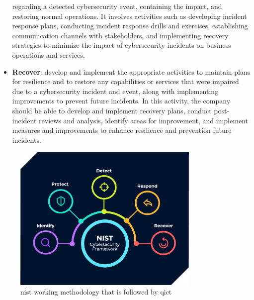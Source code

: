 \begin{itemize}
            regarding a detected cybersecurity event, containing the impact, and restoring normal operations.
            It involves activities such as developing incident response plans, conducting incident response
            drills and exercises, establishing communication channels with stakeholders, and implementing
            recovery strategies to minimize the impact of cybersecurity incidents on business operations and
            services.
      \item \textbf{Recover}: develop and implement the appropriate activities to maintain plans for
            resilience and to restore any capabilities or services that were impaired due to a cybersecurity
            incident and event, along with implementing improvements to prevent future incidents. In this
            activity,  the company should be able to develop and implement recovery plans, conduct
            post-incident reviews and analysis, identify areas for improvement, and implement measures and
            improvements to enhance resilience and prevention future incidents.
\end{itemize}

\begin{figure}[htbp]
      \centering
      \includegraphics[width=0.8\textwidth]{Figures/qict-working-method.png}
      \caption{\acrshort{nist} working methodology that is followed by \acrshort{qict}}
\end{figure}

